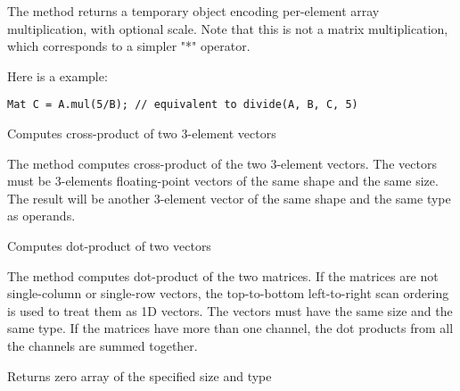 \begin{description}
\end{description}

The method returns a temporary object encoding per-element array multiplication, with optional scale. Note that this is not a matrix multiplication, which corresponds to a simpler "*" operator.

Here is a example:

\begin{lstlisting}
Mat C = A.mul(5/B); // equivalent to divide(A, B, C, 5)
\end{lstlisting}

Computes cross-product of two 3-element vectors

\begin{description}
\end{description}

The method computes cross-product of the two 3-element vectors. The vectors must be 3-elements floating-point vectors of the same shape and the same size. The result will be another 3-element vector of the same shape and the same type as operands.

Computes dot-product of two vectors

\begin{description}
\end{description}

The method computes dot-product of the two matrices. If the matrices are not single-column or single-row vectors, the top-to-bottom left-to-right scan ordering is used to treat them as 1D vectors. The vectors must have the same size and the same type. If the matrices have more than one channel, the dot products from all the channels are summed together. 

Returns zero array of the specified size and type

\begin{description}
\end{description}

